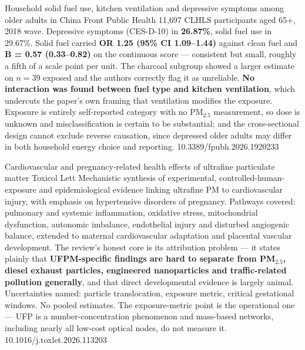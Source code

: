 \documentclass[10pt]{article}
\begin{document}
{Household solid fuel use, kitchen ventilation and depressive symptoms among older adults in China}
{Front Public Health}
{11{,}697 CLHLS participants aged 65+, 2018 wave. Depressive symptoms (CES-D-10) in
\textbf{26.87\%}, solid fuel use in 29.67\%. Solid fuel carried \textbf{OR 1.25 (95\% CI
1.09--1.44)} against clean fuel and \textbf{B = 0.57 (0.33--0.82)} on the continuous score
--- consistent but small, roughly a fifth of a scale point per unit. The charcoal subgroup
showed a larger estimate on $n=39$ exposed and the authors correctly flag it as unreliable.
\textbf{No interaction was found between fuel type and kitchen ventilation}, which
undercuts the paper's own framing that ventilation modifies the exposure. Exposure is
entirely self-reported category with no PM$_{2.5}$ measurement, so dose is unknown and
misclassification is certain to be substantial; and the cross-sectional design cannot
exclude reverse causation, since depressed older adults may differ in both household energy
choice and reporting.}
{10.3389/fpubh.2026.1920233}


{Cardiovascular and pregnancy-related health effects of ultrafine particulate matter}
{Toxicol Lett}
{Mechanistic synthesis of experimental, controlled-human-exposure and epidemiological
evidence linking ultrafine PM to cardiovascular injury, with emphasis on hypertensive
disorders of pregnancy. Pathways covered: pulmonary and systemic inflammation, oxidative
stress, mitochondrial dysfunction, autonomic imbalance, endothelial injury and disturbed
angiogenic balance, extended to maternal cardiovascular adaptation and placental vascular
development. The review's honest core is its attribution problem --- it states plainly that
\textbf{UFPM-specific findings are hard to separate from PM$_{2.5}$, diesel exhaust
particles, engineered nanoparticles and traffic-related pollution generally}, and that
direct developmental evidence is largely animal. Uncertainties named: particle
translocation, exposure metric, critical gestational windows. No pooled estimates. The
exposure-metric point is the operational one --- UFP is a number-concentration phenomenon
and mass-based networks, including nearly all low-cost optical nodes, do not measure it.}
{10.1016/j.toxlet.2026.113203}

\end{document}
